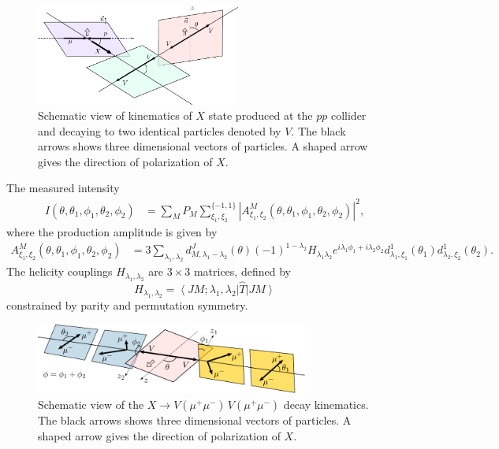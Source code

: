 \documentclass[prd,preprintnumbers,floatfix,
nofootinbib,superscriptaddress]{revtex4}
\newcommand{\ket}[1]{\ensuremath{\left|#1\right\rangle}}
\newcommand{\bra}[1]{\ensuremath{\left\langle #1\right|}}
\begin{document}
\begin{figure}
  \includegraphics[width=0.6\textwidth]{../plots/production.pdf}
  \caption{Schematic view of kinematics of $X$ state produced at the $pp$ collider and decaying to two identical particles denoted by $V$. The black arrows shows three dimensional vectors of particles. A shaped arrow gives the direction of polarization of $X$.
  }
  \label{fig:production}
\end{figure}
The measured intensity
\begin{align}
    I(\theta,\theta_1,\phi_1,\theta_2,\phi_2) &= \sum_{M}P_M
    \sum_{\xi_1,\xi_2}^{\{-1,1\}}
    \left|A^{M}_{\xi_1,\xi_2}(\theta,\theta_1,\phi_1,\theta_2,\phi_2)\right|^2,
\end{align}
where the production amplitude is given by
\begin{align}
  A^{M}_{\xi_1,\xi_2}(\theta,\theta_1,\phi_1,\theta_2,\phi_2) &= 3
  \sum_{\lambda_1,\lambda_2}
  d_{M,\lambda_1-\lambda_2}^{J}(\theta) (-1)^{1-\lambda_2}
  H_{\lambda_1\lambda_2}
  e^{i\lambda_1\phi_1+i\lambda_2\phi_2}
  d_{\lambda_1,\xi_1}^{1}(\theta_1) d_{\lambda_2,\xi_2}^{1}(\theta_2).
\end{align}
The helicity couplings $H_{\lambda_1,\lambda_2}$ are $3\times 3$ matrices,
defined by
\begin{equation}
  H_{\lambda_1,\lambda_2} = \bra{JM;\lambda_1,\lambda_2}\hat{T}\ket{JM}
\end{equation}
constrained by parity and permutation symmetry.
\begin{figure}
  \includegraphics[width=0.8\textwidth]{../plots/angles.pdf}
  \caption{Schematic view of the $X\to V(\mu^+\mu^-)\,V(\mu^+\mu^-)$ decay kinematics.
  The black arrows shows three dimensional vectors of particles. A shaped arrow gives the direction of polarization of $X$.}
  \label{fig:X.decay}
\end{figure}
\end{document}
